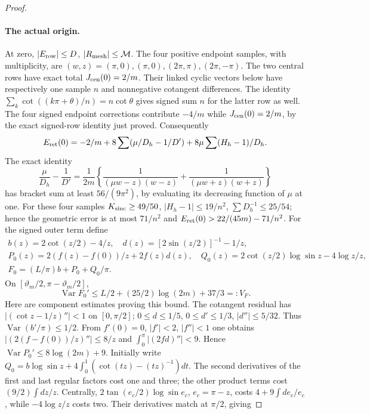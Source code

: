 \begin{proof}
\paragraph{The actual origin.}
At zero, $|E_{\rm row}|\leq D$, $|R_{\rm mesh}|\leq\mathcal M$.
The four positive endpoint samples, with multiplicity, are
$(w,z)=(\pi,0),(\pi,0),(2\pi,\pi),(2\pi,-\pi)$.
The two central rows have exact total $J_{\rm cen}(0)=2/m$.
Their linked cyclic vectors below have respectively one sample $n$
and nonnegative cotangent differences. The identity
$\sum_k\cot((k\pi+\theta)/n)=n\cot\theta$ gives signed sum $n$
for the latter row as well.
The four signed endpoint corrections contribute $-4/m$ while
$J_{\rm cen}(0)=2/m$, by the exact signed-row identity just proved.
Consequently
\[
 E_{\rm ret}(0)=-2/m+8\sum(\mu/D_h-1/D')
                         +8\mu\sum(H_h-1)/D_h.
\]
The exact identity
\[
 \frac\mu{D_h}-\frac1{D'}=\frac1{2m}
 \left\{\frac1{(\mu w-z)(w-z)}+
              \frac1{(\mu w+z)(w+z)}\right\}
\]
has bracket sum at least $56/(9\pi^2)$, by evaluating its decreasing
function of $\mu$ at one. For these four samples
$K_{\rm sinc}\geq49/50$, $|H_h-1|\leq19/n^2$, $\sum D_h^{-1}\leq25/54$;
hence the geometric error is at most $71/n^2$ and
$E_{\rm ret}(0)>22/(45m)-71/n^2$.
For the signed outer term define
\[
 \begin{gathered}
 b(z)=2\cot(z/2)-4/z,\quad d(z)=[2\sin(z/2)]^{-1}-1/z,
 \\ P_0(z)=2(f(z)-f(0))/z+2f(z)d(z),\quad
 Q_0(z)=2\cot(z/2)\log\sin z-4\log z/z,\\
 F_0=(L/\pi)b+P_0+Q_0/\pi.
 \end{gathered}
\]
On $[\vartheta_m/2,\pi-\vartheta_m/2]$,
\begin{equation}\label{uc:origin-variation}
 \operatorname{Var}F_0'\leq L/2+(25/2)\log(2m)+37/3=:V_F.
\end{equation}
Here are component estimates proving this bound. The cotangent
residual has $|(\cot z-1/z)''|<1$ on $[0,\pi/2]$;
$0\leq d\leq1/5$, $0\leq d'\leq1/3$, $|d''|\leq5/32$.
Thus $\operatorname{Var}(b'/\pi)\leq1/2$.
From $f'(0)=0$, $|f'|<2$, $|f''|<1$ one obtains
$|(2(f-f(0))/z)''|\leq8/z$ and
$\int_0^\pi|(2fd)''|<9$. Hence
$\operatorname{Var}P_0'\leq8\log(2m)+9$.
Initially write $Q_0=b\log\sin z+4\int_0^1(\cot(tz)-(tz)^{-1})dt$.
The second derivatives of the first and last regular factors cost one
and three; the other product terms cost $(9/2)\int dz/z$.
Centrally, $2\tan(e_c/2)\log\sin e_c$, $e_c=\pi-z$, costs
$4+9\int de_c/e_c$, while $-4\log z/z$ costs two.
Their derivatives match at $\pi/2$, giving

\end{proof}
